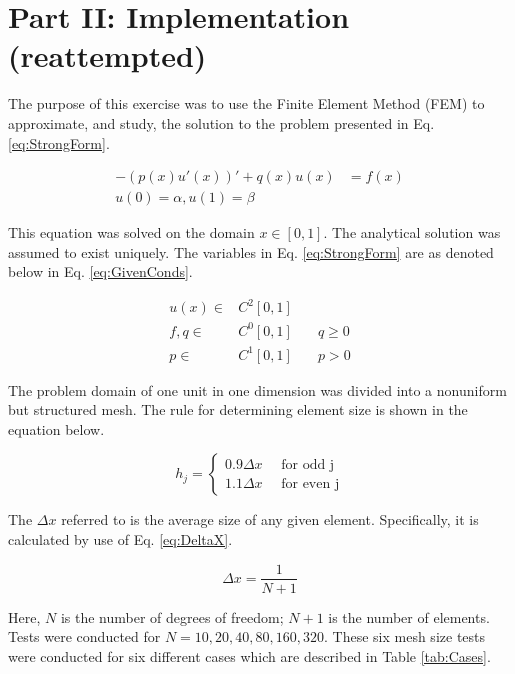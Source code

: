 \documentclass[a4paper, 12pt]{article}
\title{}
\begin{document}
\section*{Part II: Implementation (reattempted)} \label{sec:intro}
The purpose of this exercise was to use the Finite Element Method (FEM) 
to approximate, and study, the solution to the problem presented in 
Eq. \ref{eq:StrongForm}.

\begin{align}
-(p(x)u'(x))' + q(x) u(x) &= f(x)  \label{eq:StrongForm} \\
u(0) = \alpha , u(1) = \beta  &
\end{align}

\noindent
This equation was solved on the domain $x\in[0,1]$. 
The analytical solution was assumed to exist uniquely.
The variables in Eq. \ref{eq:StrongForm} are as denoted below in Eq. \ref{eq:GivenConds}.

\begin{align} \label{eq:GivenConds}
u(x)\in & C^2 [0,1]  & \\
f,q \in & C^0 [0,1] \quad & q \geq 0\\
p   \in & C^1 [0,1] \quad &p > 0
\end{align}

\noindent
The problem domain of one unit in one dimension was divided into a nonuniform but structured mesh.
The rule for determining element size is shown in the equation below.

\[
  h_{j} = \begin{cases} 
    0.9 \Delta x \quad \text{ for odd j}   \\
    1.1 \Delta x \quad \text{ for even j}
  \end{cases}
\]

\noindent
The $\Delta x$ referred to is the average size of any given element. 
Specifically, it is calculated by use of Eq. \ref{eq:DeltaX}.

\begin{equation} \label{eq:DeltaX}
\Delta x = \frac{1}{N+1}
\end{equation}

\noindent
Here, $N$ is the number of degrees of freedom; $N+1$ is the number of elements.
Tests were conducted for $N=10, 20, 40, 80, 160, 320$. 
These six mesh size tests were conducted for six different cases which are described in 
Table \ref{tab:Cases}.
\end{document}
